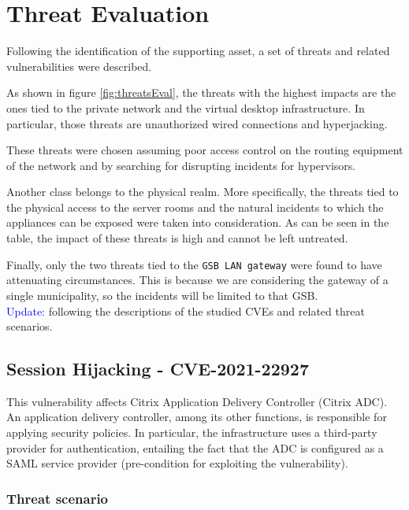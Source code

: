 \section*{Threat Evaluation}

Following the identification of the supporting asset, a set of threats and related vulnerabilities were described. 

As shown in figure \ref{fig:threatsEval}, the threats with the highest impacts are the ones tied to the private network and the virtual desktop infrastructure. In particular, those threats are unauthorized wired connections and hyperjacking\cite{online:hyperjacking}. 

These threats were chosen assuming poor access control on the routing equipment of the network and by searching for disrupting incidents for hypervisors. 

Another class belongs to the physical realm. More specifically, the threats tied to the physical access to the server rooms and the natural incidents to which the appliances can be exposed were taken into consideration. As can be seen in the table, the impact of these threats is high and cannot be left untreated.

Finally, only the two threats tied to the \texttt{GSB LAN gateway} were found to have attenuating circumstances. This is because we are considering the gateway of a single municipality, so the incidents will be limited to that GSB.\\

\noindent \textcolor{blue}{Update:} following the descriptions of the studied CVEs and related threat scenarios. 

\subsection*{Session Hijacking - CVE-2021-22927}

This vulnerability affects Citrix Application Delivery Controller (Citrix ADC). An application delivery controller, among its other functions, is responsible for applying security policies. In particular, the infrastructure uses a third-party provider for authentication, entailing the fact that the ADC is configured as a SAML service provider (pre-condition for exploiting the vulnerability).

\subsubsection*{Threat scenario}

